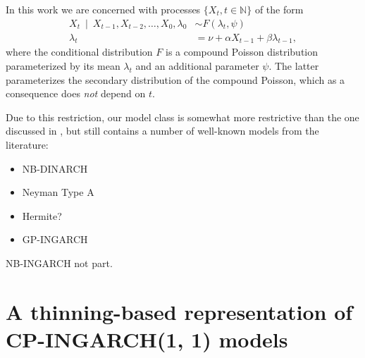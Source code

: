 \documentclass[10pt,a4paper]{article}
\begin{document}
In this work we are concerned with processes $\{X_t, t \in \mathbb{N}\}$ of the form
\begin{align*}
X_t \ \mid \ X_{t - 1}, X_{t - 2}, \dots, X_0, \lambda_0 & \sim F(\lambda_t, \psi)\\
\lambda_t & = \nu + \alpha X_{t - 1} + \beta \lambda_{t - 1},
\end{align*}
where the conditional distribution $F$ is a compound Poisson distribution parameterized by its mean $\lambda_t$ and an additional parameter $\psi$. The latter parameterizes the secondary distribution of the compound Poisson, which as a consequence does \textit{not} depend on $t$.

Due to this restriction, our model class is somewhat more restrictive than the one discussed in \citep{Goncalves2015}, but still contains a number of well-known models from the literature:

\begin{itemize}
\item NB-DINARCH
\item Neyman Type A
\item Hermite?
\item GP-INGARCH
\end{itemize}

NB-INGARCH not part.

\section{A thinning-based representation of CP-INGARCH(1, 1) models}
\end{document}
